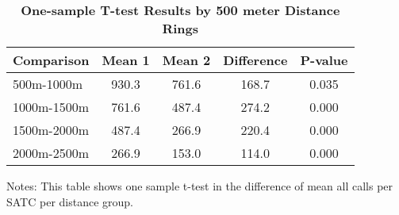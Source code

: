 \begin{table}[htbp]
\centering
\begin{tabular}{l|c c c c}
\hline
Comparison & Mean 1 & Mean 2 & Difference & P-value \\
\hline
500m-1000m & 930.3 & 761.6 & 168.7 & 0.035 \\
1000m-1500m & 761.6 & 487.4 & 274.2 & 0.000 \\
1500m-2000m & 487.4 & 266.9 & 220.4 & 0.000 \\
2000m-2500m & 266.9 & 153.0 & 114.0 & 0.000 \\
\hline
\end{tabular}
\caption{\textbf{One-sample T-test Results by 500 meter Distance Rings}}
\label{tab:ttests_500}
\centering\footnotesize{Notes: This table shows one sample t-test in the difference of mean all calls per SATC per distance group.}
\end{table}
